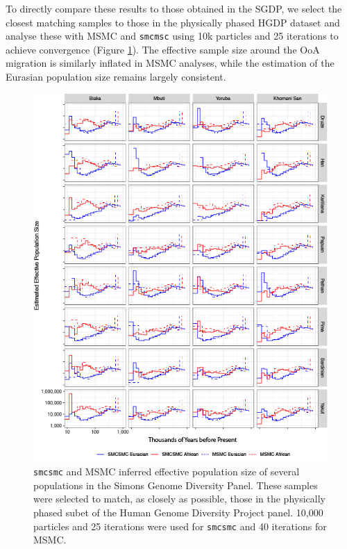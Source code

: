 \documentclass{article}
\begin{document}
To directly compare these results to those obtained in the SGDP, we select the closest matching samples to those in the physically phased HGDP dataset and analyse these with MSMC and {\tt smcmsc} using 10k particles and 25 iterations to achieve convergence (Figure \ref{hgdp_sgdp_ne}). The effective sample size around the OoA migration is similarly inflated in MSMC analyses, while the estimation of the Eurasian population size remains largely consistent.  

\begin{figure}
    \centering
    \includegraphics[width=\linewidth]{../plot/sgdp_subset_ne.png}
    \caption{{\tt smcsmc} and MSMC inferred effective population size of several populations in the Simons Genome Diversity Panel. These samples were selected to match, as closely as possible, those in the physically phased subet of the Human Genome Diversity Project panel. 10,000 particles and 25 iterations were used for {\tt smcsmc} and 40 iterations for MSMC.}
    \label{hgdp_sgdp_ne}
\end{figure}
\end{document}
